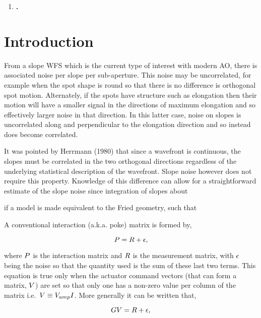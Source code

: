 \documentclass[a4paper]{article}
\begin{document}
\begin{enumerate}
  \item {\bf .}  
\end{enumerate}

\section{Introduction}

From a slope WFS which is the current type of interest with modern AO, there is
associated noise per slope per sub-aperture. This noise may be uncorrelated,
for example when the spot shape is round so that there is no difference is
orthogonal spot motion. Alternately, if the spots have structure such as
elongation then their motion will have a smaller signal in the directions
of maximum elongation and so effectively larger noise in that direction. In 
this latter case, noise on slopes is uncorrelated along and perpendicular
to the elongation direction and so instead does become correlated.

It was pointed by Herrmann (1980) that since a wavefront is continuous,
the slopes must be correlated in the two orthogonal directions regardless
of the underlying statistical description of the wavefront. Slope noise
however does not require this property. Knowledge of this difference can allow
for a straightforward estimate of the slope noise since integration of slopes
about 

if a model is made equivalent to the
Fried geometry, such that 


A conventional interaction (a.k.a. poke) matrix is formed by,

\begin{equation}
   \mathnormal{P}=\mathnormal{R}+\mathnormal{\epsilon},
\end{equation}

where $\mathnormal{P}$ is the interaction matrix and $\mathnormal{R}$ is the
measurement matrix, with $\mathnormal{\epsilon}$ being the noise so that the
quantity used is the sum of these last two terms. This equation is true only
when the actuator command vectors (that can form a matrix, $\mathnormal{V}$) are
set so that only one has a non-zero value per column of the matrix
i.e.~$\mathnormal{V}\equiv V_{amp}\mathnormal{I}$. More generally it can be written
that,

\begin{equation}
   \mathnormal{G}\mathnormal{V}=\mathnormal{R}+\mathnormal{\epsilon},
   \label{eqn:gen}
\end{equation}
\end{document}
